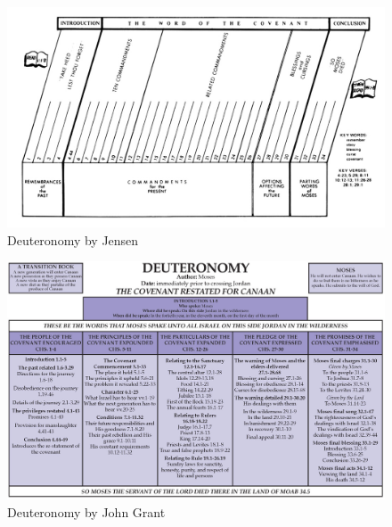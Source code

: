 \newpage
\begin{figure}
\begin{center}
\includegraphics[scale=2.2, angle=90]{05OT-Deuteronomy/References/JensenDeuteronomy.png}
\caption[Deuteronomy by Jensen]{Deuteronomy by Jensen}
\label{fig:Deuteronomy by Jensen}
\end{center}
\end{figure}

\newpage
\begin{figure}
\begin{center}
\includegraphics[scale=0.4, angle=90]{05OT-Deuteronomy/References/JohnGrantDeuteronomy.jpg}
\caption[Deuteronomy by John Grant]{Deuteronomy by John Grant}
\label{fig:Deuteronomy by John Grant}
\end{center}
\end{figure}

